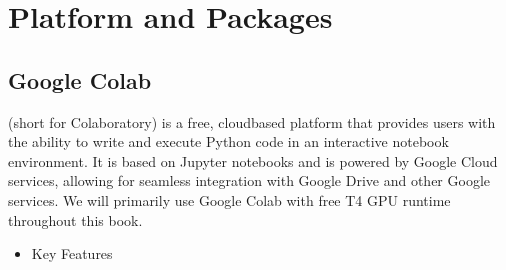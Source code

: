 \documentclass[letterpaper,11pt,english]{sphinxmanual}
\begin{document}
\begin{itemize}
\begin{itemize}
\end{itemize}

\end{itemize}


\section{Platform and Packages}
\label{\detokenize{prelim:platform-and-packages}}

\subsection{Google Colab}
\label{\detokenize{prelim:google-colab}}
\sphinxAtStartPar
{} (short for Colaboratory) is a free, cloud\sphinxhyphen{}based platform that provides users with the ability to write
and execute Python code in an interactive notebook environment. It is based on Jupyter notebooks and is powered by
Google Cloud services, allowing for seamless integration with Google Drive and other Google services. We will primarily
use Google Colab with free T4 GPU runtime throughout this book.
\begin{itemize}
\item {} 
\sphinxAtStartPar
Key Features

\end{itemize}
\end{document}
